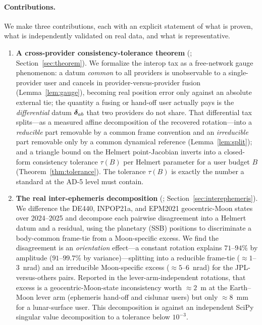 \paragraph{Contributions.}
We make three contributions, each with an explicit statement of what is proven,
what is independently validated on real data, and what is representative.

\begin{enumerate}
  \item \textbf{A cross-provider consistency-tolerance theorem} (\Proven{};
  Section~\ref{sec:theorem}). We formalize the interop tax as a free-network gauge
  phenomenon: a datum \emph{common} to all providers is unobservable to a
  single-provider user and cancels in provider-versus-provider fusion
  (Lemma~\ref{lem:gauge}), becoming real position error only against an absolute
  external tie; the quantity a fusing or hand-off user actually pays is the
  \emph{differential} datum $\bm{\delta}_{ab}$ that two providers do not share. That
  differential tax splits---as a measured affine decomposition of the recovered
  rotation---into a \emph{reducible} part removable by a common frame convention and
  an \emph{irreducible} part removable only by a common dynamical reference
  (Lemma~\ref{lem:split}); and a triangle bound on the Helmert point-Jacobian inverts
  into a closed-form consistency tolerance $\tau(B)$ per Helmert parameter for a user
  budget $B$ (Theorem~\ref{thm:tolerance}). The tolerance $\tau(B)$ is exactly the
  number a standard at the AD-5 level must contain.

  \item \textbf{The real inter-ephemeris decomposition} (\Validated{};
  Section~\ref{sec:interephemeris}). We difference the DE440, INPOP21a, and EPM2021
  geocentric-Moon states over 2024--2025 and decompose each pairwise disagreement
  into a Helmert datum and a residual, using the planetary (SSB) positions to
  discriminate a body-common frame-tie from a Moon-specific excess. We find the
  disagreement is an \emph{orientation} effect---a constant rotation explains
  $71$--$94\%$ by amplitude ($91$--$99.7\%$ by variance)---splitting into a reducible
  frame-tie ($\approx\!1$--$3$~nrad) and an irreducible Moon-specific excess
  ($\approx\!5$--$6$~nrad) for the JPL-versus-others pairs. Reported in the
  lever-arm-independent rotations, that excess is a geocentric-Moon-state
  inconsistency worth $\approx\!2$~m at the Earth--Moon lever arm (ephemeris hand-off
  and cislunar users) but only $\approx\!8$~mm for a lunar-surface user. This
  decomposition is \Validated{} against an independent SciPy singular value
  decomposition to a tolerance below $10^{-3}$.


\end{enumerate}
